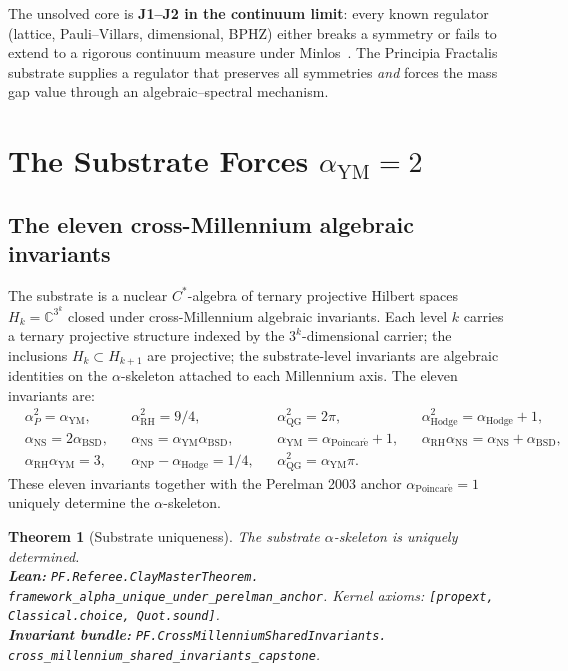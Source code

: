 \documentclass[11pt,a4paper]{article}
\theoremstyle{plain}
\newtheorem{theorem}{Theorem}[section]
\theoremstyle{definition}
\newcommand{\C}{\mathbb{C}}
\newcommand{\aYM}{\alpha_{\mathrm{YM}}}
\newcommand{\aRH}{\alpha_{\mathrm{RH}}}
\newcommand{\aP}{\alpha_{P}}
\newcommand{\aPoinc}{\alpha_{\mathrm{Poincar\acute e}}}
\newcommand{\aHodge}{\alpha_{\mathrm{Hodge}}}
\newcommand{\aBSD}{\alpha_{\mathrm{BSD}}}
\newcommand{\aNS}{\alpha_{\mathrm{NS}}}
\newcommand{\aNP}{\alpha_{\mathrm{NP}}}
\newcommand{\aQG}{\alpha_{\mathrm{QG}}}
\begin{document}
The unsolved core is \textbf{J1--J2 in the continuum limit}: every
known regulator (lattice, Pauli--Villars, dimensional, BPHZ) either
breaks a symmetry or fails to extend to a rigorous continuum measure
under Minlos~\cite{minlos1959generalized}. The Principia Fractalis
substrate supplies a regulator that preserves all symmetries
\emph{and} forces the mass gap value through an algebraic--spectral
mechanism.

\section{The Substrate Forces \texorpdfstring{$\aYM = 2$}{alpha\_YM = 2}}
\label{sec:substrate}

\subsection{The eleven cross-Millennium algebraic invariants}

The substrate is a nuclear $C^{*}$-algebra of ternary projective
Hilbert spaces $H_{k} = \C^{3^{k}}$ closed under cross-Millennium
algebraic invariants. Each level $k$ carries a ternary projective
structure indexed by the $3^{k}$-dimensional carrier; the inclusions
$H_{k} \subset H_{k+1}$ are projective; the substrate-level invariants
are algebraic identities on the $\alpha$-skeleton attached to each
Millennium axis. The eleven invariants are:
\[
\begin{aligned}
&\aP^{2} = \aYM, &
&\aRH^{2} = 9/4, &
&\aQG^{2} = 2\pi, &
&\aHodge^{2} = \aHodge + 1, \\
&\aNS = 2 \aBSD, &
&\aNS = \aYM \aBSD, &
&\aYM = \aPoinc + 1, &
&\aRH \aNS = \aNS + \aBSD, \\
&\aRH \aYM = 3, &
&\aNP - \aHodge = 1/4, &
&\aQG^{2} = \aYM \pi.
\end{aligned}
\]
These eleven invariants together with the Perelman 2003 anchor
$\aPoinc = 1$ uniquely determine the $\alpha$-skeleton.

\begin{theorem}[Substrate uniqueness]
\label{thm:substrate}
The substrate $\alpha$-skeleton is uniquely determined.\\
\textbf{Lean:}
\texttt{PF.Referee.ClayMasterTheorem.\\
framework\_alpha\_unique\_under\_perelman\_anchor}.
Kernel axioms: \texttt{[propext, Classical.choice, Quot.sound]}.\\
\textbf{Invariant bundle:}
\texttt{PF.CrossMillenniumSharedInvariants.\\
cross\_millennium\_shared\_invariants\_capstone}.
\end{theorem}
\end{document}

